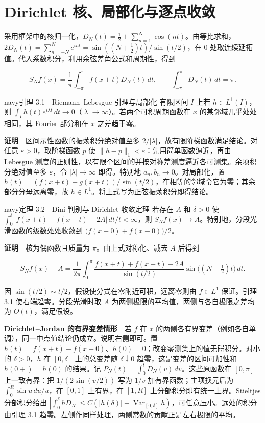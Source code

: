 \documentclass[12pt,a4paper]{article}
\newcommand{\mysection}[1]{\clearpage\section{#1}}
\begin{document}
\mysection{Dirichlet 核、局部化与逐点收敛}


采用框架中的核归一化，\(D_N(t)=\tfrac12+\sum_{n=1}^N\cos(nt)\)。由等比求和，\(2D_N(t)=\sum_{n=-N}^{N}e^{int}=\sin((N+\tfrac12)t)/\sin(t/2)\)，在 \(0\) 处取连续延拓值。代入系数积分，利用余弦差角公式和周期性，得到

\[
 S_N f(x)=\frac1\pi\int_{-\pi}^{\pi}f(x+t)D_N(t)\,dt,
 \qquad \int_{-\pi}^{\pi}D_N(t)\,dt=\pi .
\]

\begin{sboxenv}{navy}{引理 3.1　Riemann--Lebesgue 引理与局部化}
有限区间 \(I\) 上若 \(h\in L^1(I)\)，则 \(\int_I h(t)e^{i\lambda t}\,dt\to0\)（\(|\lambda|\to\infty\)）。若两个可积周期函数在 \(x\) 的某邻域几乎处处相同，其 Fourier 部分和在 \(x\) 之差趋于零。
\end{sboxenv}

\textbf{证明}　区间示性函数的振荡积分绝对值至多 \(2/|\lambda|\)，故有限阶梯函数满足结论。对任意 \(\varepsilon>0\)，取阶梯函数 \(p\) 使 \(\|h-p\|_1<\varepsilon\)：先用简单函数逼近，再由 Lebesgue 测度的正则性，以有限个区间的并按对称差测度逼近各可测集。余项积分绝对值至多 \(\varepsilon\)，令 \(|\lambda|\to\infty\) 即得。特别地 \(a_n,b_n\to0\)。对局部化，置 \(h(t)=(f(x+t)-g(x+t))/\sin(t/2)\)，在相等的邻域令它为零；其余部分分母远离零，故 \(h\in L^1\)。将上式写为正弦振荡积分即得结论。

\begin{sboxenv}{navy}{定理 3.2　Dini 判别与 Dirichlet 收敛定理}
若存在 \(A\) 和 \(\delta>0\) 使 \(\int_0^\delta |f(x+t)+f(x-t)-2A|\,dt/t<\infty\)，则 \(S_Nf(x)\to A\)。特别地，分段光滑函数的级数处处收敛到 \(\big(f(x+0)+f(x-0)\big)/2\)。
\end{sboxenv}

\textbf{证明}　核为偶函数且质量为 \(\pi\)。由上式对称化、减去 \(A\) 后得到

\[
 S_N f(x)-A=\frac1{2\pi}\int_0^\pi
 \frac{f(x+t)+f(x-t)-2A}{\sin(t/2)}
 \sin\big((N+\tfrac12)t\big)\,dt .
\]

因 \(\sin(t/2)\sim t/2\)，假设使分式在零附近可积，远离零则由 \(f\in L^1\) 保证。引理 3.1 使右端趋零。分段光滑时取 \(A\) 为两侧极限的平均值，两侧与各自极限之差均为 \(O(t)\)，满足假设。

\textbf{Dirichlet--Jordan 的有界变差情形}　若 \(f\) 在 \(x\) 的两侧各有界变差（例如各自单调），同一中点值结论仍成立。说明右侧即可。置 \(h(t)=f(x+t)-f(x+0)\)、\(h(0)=0\)；改变零测集上的值无碍积分。对小的 \(\delta>0\)，\(h\) 在 \([0,\delta]\) 上的总变差随 \(\delta\downarrow0\) 趋零，这是变差的区间可加性和 \(h(0+)=h(0)\) 的结果。记 \(P_N(t)=\int_0^t D_N(v)\,dv\)。这些原函数在 \([0,\pi]\) 上一致有界：把 \(1/(2\sin(v/2))\) 写为 \(1/v\) 加有界函数；主项换元后为 \(\int_0^R \sin u\,du/u\)，在 \([0,1]\) 上有界，在 \([1,R]\) 上分部积分即有统一上界。Stieltjes 分部积分给出 \(|\int_0^\delta hD_N|\le C(|h(\delta)|+\operatorname{Var}_{[0,\delta]}h)\)，可任意压小。远处的积分由引理 3.1 趋零。左侧作同样处理，两侧常数的贡献正是左右极限的平均。
\end{document}

